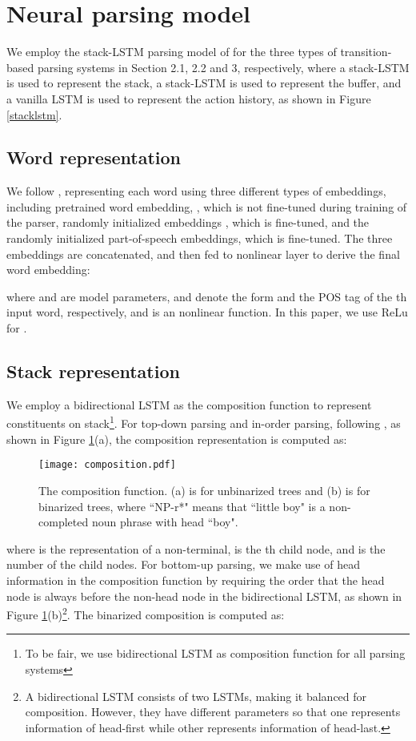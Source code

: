 \documentclass[11pt,letterpaper]{article}
\begin{document}
\section{Neural parsing model}
We employ the stack-LSTM parsing model of  for the three types of transition-based parsing systems in Section 2.1, 2.2 and 3, respectively, where a stack-LSTM is used to represent the stack, a stack-LSTM is used to represent the buffer, and a vanilla LSTM is used to represent the action history, as shown in Figure \ref{stacklstm}.

\subsection{Word representation}
We follow , representing each word using three different types of embeddings, including pretrained word embedding, , which is not fine-tuned during training of the parser, randomly initialized embeddings , which is fine-tuned, and the randomly initialized part-of-speech embeddings, which is fine-tuned.
The three embeddings are concatenated, and then fed to nonlinear layer to derive the final word embedding: 

where  and  are model parameters,  and  denote the form and the POS tag of the th input word, respectively, and  is an nonlinear function.
In this paper, we use ReLu for . 

\subsection{Stack representation}
We employ a bidirectional LSTM as the composition function to represent constituents on stack\footnote{To be fair, we use bidirectional LSTM as composition function for all parsing systems}.
For top-down parsing and in-order parsing, following , as shown in Figure \ref{composition}(a), the composition representation  is computed as:

\begin{figure}
\begin{center}
\texttt{[image: composition.pdf]}
\end{center}
\caption{\label{composition} The composition function. (a) is for unbinarized trees and (b) is for binarized trees, where ``NP-r*" means that ``little boy" is a non-completed noun phrase with head ``boy".}
\end{figure}
where  is the representation of a non-terminal,  is the th child node, and  is the number of the child nodes. 
For bottom-up parsing, we make use of head information in the composition function by requiring the order that the head node is always before the non-head node in the bidirectional LSTM, as shown in Figure \ref{composition}(b)\footnote{A bidirectional LSTM consists of two LSTMs, making it balanced for composition. However, they have different parameters so that one represents information of head-first while other represents information of head-last.}.
The binarized composition is computed as:
\end{document}
